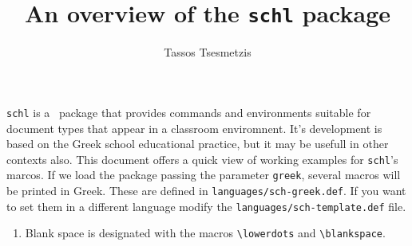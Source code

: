 \documentclass[10pt,a4page]{article}
\author{Tassos Tsesmetzis}
\title{An overview of the \texttt{schl} package}
\date{}
\def\cellwidth{0.4\textwidth}
\newcommand{\miniexample}[3][t]{%
  \parbox[#1][#3][t]{\cellwidth}{#2}
}
\newcommand{\codeexample}[3][c]{%
  \colorbox[HTML]{b0c4be}{\miniexample[#1]{}{#3}}
}
\newcommand{\textexample}[3][c]{%
  {\footnotesize
    \colorbox[gray]{0.9}{\miniexample[#1]{}{#3}}%
  }
}
\newcommand{\examplerow}[3][10pt]{%
  \par\noindent\strut\hfill\codeexample{#2}{#3}\hspace{#1}\textexample{#2}{#3}\hfill\strut
}
\newlength{\exheight}
\begin{document}
\maketitle

\verb|schl| is a \XeLaTeX\, package that provides commands and environments suitable for document types that appear in a classroom enviromnent. It's development is based on the Greek school educational practice, but it may be usefull in other contexts also. This document offers a quick view of working examples for \verb|schl|'s marcos. If we load the package passing the parameter \verb|greek|, several macros will be printed in Greek. These are
defined in \verb|languages/sch-greek.def|. If you want to set them in a different language modify the \verb|languages/sch-template.def| file.

\begin{enumerate}
\item Blank space is designated with the macros \verb|\lowerdots| and \verb|\blankspace|.
  \setlength{\exheight}{18pt}
  \lstset{
    aboveskip=1pt
  }
  \examplerow{exampleMacroBlankspace01.tex}{\exheight}
  \setlength{\exheight}{19pt}
  \examplerow{exampleMacroBlankspace02.tex}{\exheight}
  \setlength{\exheight}{19pt}
  \examplerow{exampleMacroBlankspace03.tex}{\exheight}
  \setlength{\exheight}{28pt}
  \examplerow{exampleMacroBlankspace04.tex}{\exheight}


\end{enumerate}
\end{document}

